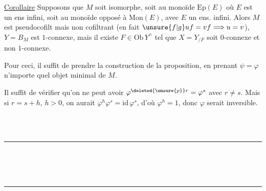 
\uline{Corollaire} Supposons que $M$ soit  isomorphe, soit au monoïde $\mathrm{Ep}(E)$ où $E$ est un ens infini, soit au monoïde opposé à $\mathrm{Mon}(E)$, avec $E$ un ens. infini. Alors $M$ est pseudocofilt mais non cofiltrant (en fait $\unsure{f|g}uf=vf\Longrightarrow u=v$), $Y=B_M$ est $1$-connexe, mais il existe $F\in\mathrm{Ob}\,Y^\wedge$ tel que $X=Y_{/F}$ soit $0$-connexe et non $1$-connexe.

Pour ceci, il suffit de prendre  la construction de la proposition, en prenant  $\psi=\varphi$ n'importe quel objet minimal de $M$.

Il suffit de vérifier qu'on ne peut avoir $\varphi^{\deleted{\unsure{p}}r}=\varphi^s$ avec $r\ne s$. Mais si $r=s+h$, $h>0$, on aurait $\varphi^h\varphi^s=\mathrm{id}\,\varphi^s$, d'où $\varphi^h=1$, donc $\varphi$ serait inversible.
\par\smallskip
{\footnotesize\noindent\begin{minipage}[t]{.46\linewidth}\raggedright
{}\\ \\ \rule{2.6em}{.3pt}\\ \\ \\ \rule{2.6em}{.3pt}\\ \\ 
\end{minipage}\hfill%
\begin{minipage}[t]{.51\linewidth}\raggedright
{}\\ \\ \\ \\ 
\end{minipage}\par}

